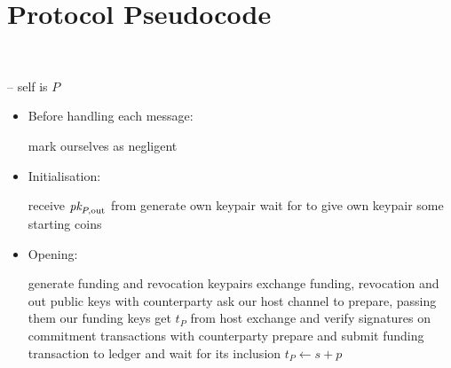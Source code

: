 \section{Protocol Pseudocode} \ \\
\label{sec:pseudocode}

\begin{center}
  \begin{processbox}{\pchan -- self is $P$}
    \begin{itemize}
      \item Before handling each message:
      \begin{algorithmic}[0]
          \State mark ourselves as negligent 
        \EndIf
      \end{algorithmic}

      \item Initialisation:
      \begin{algorithmic}[0]
        \State receive $\textit{pk}_{P, \mathrm{out}}$ from \environment {}
        \State generate own keypair
        \State wait for \environment to give own keypair some starting coins
      \end{algorithmic}

      \item Opening:
      \begin{algorithmic}[0]
        \State generate funding and revocation keypairs
        \State exchange funding, revocation and out public keys with
        counterparty
          \State ask our host channel to prepare, passing them our funding keys
          \State get $t_P$ from host 
        \EndIf
        \State exchange and verify signatures on commitment transactions with
        counterparty
          \State prepare and submit funding transaction to ledger and wait for
          its inclusion 
          \State $t_P \gets s + p$ 
        \EndIf
      \end{algorithmic}


\end{itemize}
\end{processbox}
\end{center}
